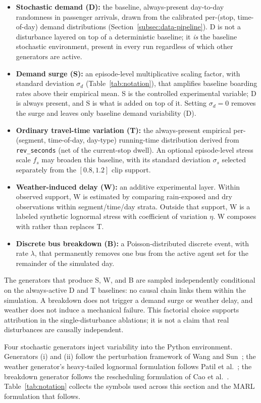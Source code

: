 \begin{itemize}
\item \textbf{Stochastic demand (D):} the baseline, always-present day-to-day randomness in passenger arrivals, drawn from the calibrated per-(stop, time-of-day) demand distributions (Section~\ref{subsec:data-pipeline}). D is not a disturbance layered on top of a deterministic baseline; it \textit{is} the baseline stochastic environment, present in every run regardless of which other generators are active.
\item \textbf{Demand surge (S):} an episode-level multiplicative scaling factor, with standard deviation $\sigma_d$ (Table~\ref{tab:notation}), that amplifies baseline boarding rates above their empirical mean. S is the controlled experimental variable; D is always present, and S is what is added on top of it. Setting $\sigma_d = 0$ removes the surge and leaves only baseline demand variability (D).
\item \textbf{Ordinary travel-time variation (T):} the always-present empirical per-(segment, time-of-day, day-type) running-time distribution derived from \texttt{rev\_seconds} (net of the current-stop dwell). An optional episode-level stress scale $f_s$ may broaden this baseline, with its standard deviation $\sigma_s$ selected separately from the $[0.8,1.2]$ clip support.
\item \textbf{Weather-induced delay (W):} an additive experimental layer. Within observed support, W is estimated by comparing rain-exposed and dry observations within segment/time/day strata. Outside that support, W is a labeled synthetic lognormal stress with coefficient of variation $\eta$. W composes with rather than replaces T.
\item \textbf{Discrete bus breakdown (B):} a Poisson-distributed discrete event, with rate $\lambda$, that permanently removes one bus from the active agent set for the remainder of the simulated day.
\end{itemize}

The generators that produce S, W, and B are sampled independently conditional on the always-active D and T baselines: no causal chain links them within the simulation. A breakdown does not trigger a demand surge or weather delay, and weather does not induce a mechanical failure. This factorial choice supports attribution in the single-disturbance ablations; it is not a claim that real disturbances are causally independent.

Four stochastic generators inject variability into the Python environment. Generators (i) and (ii) follow the perturbation framework of Wang and Sun~\cite{Wangsun}; the weather generator's heavy-tailed lognormal formulation follows Patil et al.~\cite{Patil2025Conformal}; the breakdown generator follows the rescheduling formulation of Cao et al.~\cite{Cao2022Train}. Table~\ref{tab:notation} collects the symbols used across this section and the MARL formulation that follows.


